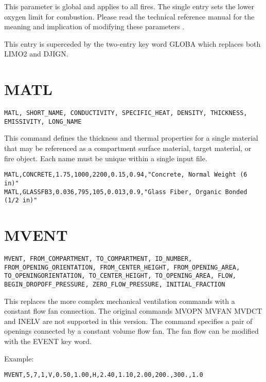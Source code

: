This parameter is global and applies to all fires. The single entry sets the lower oxygen limit for combustion.  Please read the technical reference manual for the meaning and implication of modifying these parameters \cite{CFAST_Tech_Guide_6}.

This entry is superceded by the two-entry key word GLOBA which replaces both LIMO2 and DJIGN.

\section{MATL}

\begin{lstlisting}
MATL, SHORT_NAME, CONDUCTIVITY, SPECIFIC_HEAT, DENSITY, THICKNESS, EMISSIVITY, LONG_NAME
\end{lstlisting}

This command defines the thickness and thermal properties for a single material that may be referenced as a compartment surface material, target material, or fire object. Each name must be unique within a single input file.

\begin{lstlisting}
MATL,CONCRETE,1.75,1000,2200,0.15,0.94,"Concrete, Normal Weight (6 in)"
MATL,GLASSFB3,0.036,795,105,0.013,0.9,"Glass Fiber, Organic Bonded (1/2 in)"
\end{lstlisting}

\section{MVENT}

\begin{lstlisting}
MVENT, FROM_COMPARTMENT, TO_COMPARTMENT, ID_NUMBER, FROM_OPENING_ORIENTATION, FROM_CENTER_HEIGHT, FROM_OPENING_AREA, TO_OPENINGORIENTATION, TO_CENTER_HEIGHT, TO_OPENING_AREA, FLOW, BEGIN_DROPOFF_PRESSURE, ZERO_FLOW_PRESSURE, INITIAL_FRACTION
\end{lstlisting}

This replaces the more complex mechanical ventilation commands with a constant flow fan connection.  The original commands MVOPN MVFAN MVDCT and INELV are not supported in this version. The command specifies a pair of openings connected by a constant volume flow fan. The fan flow can be modified with the EVENT key word.

Example:

\begin{lstlisting}
MVENT,5,7,1,V,0.50,1.00,H,2.40,1.10,2.00,200.,300.,1.0
\end{lstlisting}

